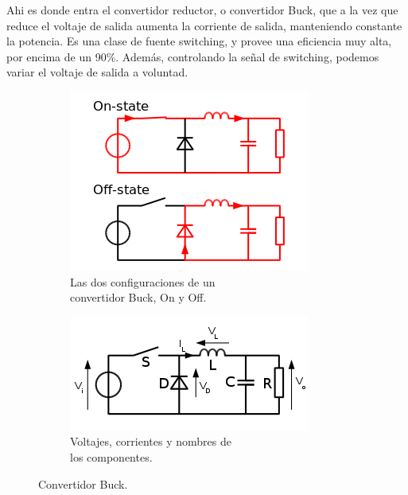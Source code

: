 Ahi es donde entra el convertidor reductor, o convertidor Buck, que a la vez que reduce el voltaje de salida aumenta la corriente de salida, manteniendo constante la potencia. Es una clase de fuente switching, y provee una eficiencia muy alta, por encima de un 90\%. Además, controlando la señal de switching, podemos variar el voltaje de salida a voluntad.

\begin{figure}[H]
\begin{subfigure}{0.5\textwidth}
\includegraphics[width=0.9\linewidth]{MPPT/Buck_operating.svg.png} 
\caption{Las dos configuraciones de un \\convertidor Buck, On y Off.}
\label{fig:buck-1}
\end{subfigure}
\begin{subfigure}{0.5\textwidth}
\includegraphics[width=0.9\linewidth]{MPPT/300px-Buck_conventions.svg.png}
\caption{Voltajes, corrientes y nombres de \\los componentes.}
\label{fig:buck-2}
\end{subfigure}

\caption{Convertidor Buck.}
\label{fig:image2}
\end{figure}

